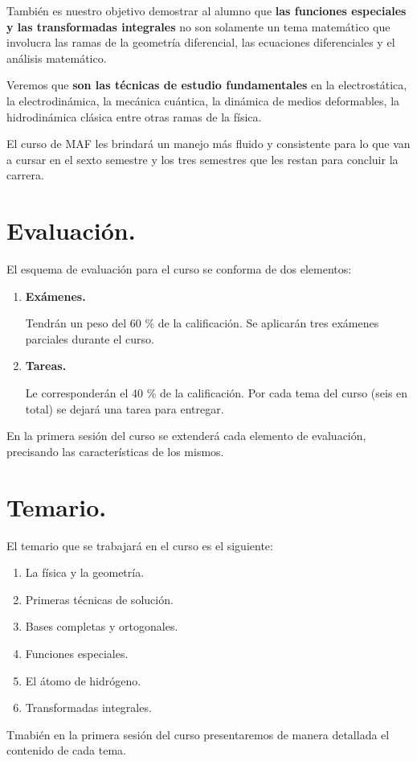 \documentclass[14pt]{extarticle}
\numberwithin{equation}{section}
\begin{document}
También es nuestro objetivo demostrar al alumno que \textbf{las funciones especiales y las transformadas integrales} no son solamente un tema matemático que involucra las ramas de la geometría diferencial, las ecuaciones diferenciales y el análisis matemático.

Veremos que \textbf{son las técnicas de estudio fundamentales} en la electrostática, la electrodinámica, la mecánica cuántica, la dinámica de medios deformables, la hidrodinámica clásica entre otras ramas de la física.

El curso de MAF les brindará un manejo más fluido y consistente para lo que van a cursar en el sexto semestre y los tres semestres que les restan para concluir la carrera.

\section{Evaluación.}

El esquema de evaluación para el curso se conforma de dos elementos:
\begin{enumerate}[label=\alph*)]
\item \textbf{Exámenes.}

Tendrán un peso del \num{60} \% de la calificación. Se aplicarán tres exámenes parciales durante el curso.
\item \textbf{Tareas.}

Le corresponderán el \num{40} \% de la calificación. Por cada tema del curso (seis en total) se dejará una tarea para entregar.
\end{enumerate}
En la primera sesión del curso se extenderá cada elemento de evaluación, precisando las características de los mismos.

\newpage

\section{Temario.}

El temario que se trabajará en el curso es el siguiente:

\begin{enumerate}[label=Tema \arabic*., leftmargin=3\parindent]
\item La física y la geometría.
\item Primeras técnicas de solución.
\item Bases completas y ortogonales.
\item Funciones especiales.
\item El átomo de hidrógeno.
\item Transformadas integrales.
\end{enumerate}
Tmabién en la primera sesión del curso presentaremos de manera detallada el contenido de cada tema.
\end{document}
